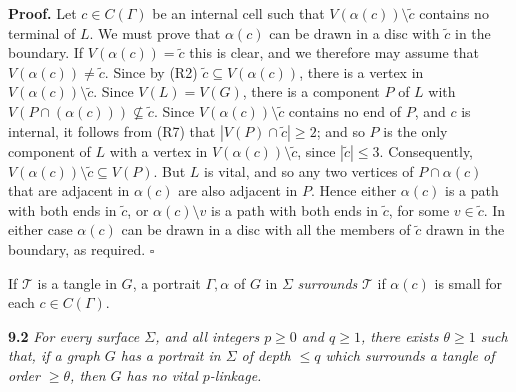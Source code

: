\textbf{Proof.} Let $c \in C(\Gamma)$ be an internal cell such that $V(\alpha(c)) \setminus \tilde{c}$ contains no terminal of $L$. We must prove that $\alpha(c)$ can be drawn in a disc with $\tilde{c}$ in the boundary. If $V(\alpha(c)) = \tilde{c}$ this is clear, and we therefore may assume that $V(\alpha(c)) \ne \tilde{c}$. Since by (R2) $\tilde{c} \subseteq V(\alpha(c))$, there is a vertex in $V(\alpha(c)) \setminus \tilde{c}$. Since $V(L) = V(G)$, there is a component $P$ of $L$ with $V(P \cap (\alpha(c))) \not\subseteq \tilde{c}$. Since $V(\alpha(c)) \setminus \tilde{c}$ contains no end of $P$, and $c$ is internal, it follows from (R7) that $|V(P) \cap \tilde{c}| \ge 2$; and so $P$ is the only component of $L$ with a vertex in $V(\alpha(c)) \setminus \tilde{c}$, since $|\tilde{c}| \le 3$. Consequently, $V(\alpha(c)) \setminus \tilde{c} \subseteq V(P)$. But $L$ is vital, and so any two vertices of $P \cap \alpha(c)$ that are adjacent in $\alpha(c)$ are also adjacent in $P$. Hence either $\alpha(c)$ is a path with both ends in $\tilde{c}$, or $\alpha(c) \setminus v$ is a path with both ends in $\tilde{c}$, for some $v \in \tilde{c}$. In either case $\alpha(c)$ can be drawn in a disc with all the members of $\tilde{c}$ drawn in the boundary, as required. $\square$

If $\mathcal{T}$ is a tangle in $G$, a portrait $\Gamma, \alpha$ of $G$ in $\Sigma$ \textit{surrounds} $\mathcal{T}$ if $\alpha(c)$ is small for each $c \in C(\Gamma)$.

\textbf{9.2} \textit{For every surface $\Sigma$, and all integers $p \ge 0$ and $q \ge 1$, there exists $\theta \ge 1$ such that, if a graph $G$ has a portrait in $\Sigma$ of depth $\le q$ which surrounds a tangle of order $\ge \theta$, then $G$ has no vital $p$-linkage.}
